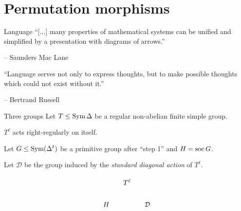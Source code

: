 \documentclass{beamer}
\theoremstyle{plain}
\theoremstyle{definition}
\begin{document}
\section{Permutation morphisms}
\begin{frame}{Language}
``[...] many properties of mathematical systems can be unified and simplified
by a presentation with diagrams of arrows.''

\hfill --
Saunders Mac Lane
\hspace{2em}

\vspace{2em}

``Language serves not only to express thoughts, but to make possible thoughts
which could not exist without it.''

\hfill --
Bertrand Russell
\hspace{2em}
\end{frame}

\begin{frame}{Three groups}
Let $T \leq \operatorname{Sym} \Delta$ be a regular non-abelian finite simple group.

$T ^ \ell$ acts right-regularly on itself.

Let $G \leq \operatorname{Sym}(\Delta ^ \ell)$ be a primitive group after
``step 1'' and $H = \operatorname{soc} G$.


Let $\mathcal D$ be the group induced by the \emph{standard diagonal action} of $T ^ \ell$.

\pause
\[
\begin{tikzcd}[column sep=small, ampersand replacement=\&]
    \&
    T ^ \ell
    \&
    \\
    H
    \&
    \&
    \mathcal D
\end{tikzcd}
\]
\end{frame}

\end{document}
